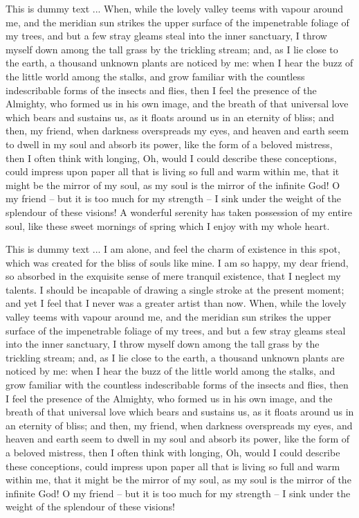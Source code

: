 \documentclass[letterpaper,oneside,11pt]{book}
\begin{document}
This is dummy text ... When, while the lovely valley teems with vapour around me, and the meridian sun strikes the upper surface of the impenetrable foliage of my trees, and but a few stray gleams steal into the inner sanctuary, I throw myself down among the tall grass by the trickling stream; and, as I lie close to the earth, a thousand unknown plants are noticed by me: when I hear the buzz of the little world among the stalks, and grow familiar with the countless indescribable forms of the insects and flies, then I feel the presence of the Almighty, who formed us in his own image, and the breath of that universal love which bears and sustains us, as it floats around us in an eternity of bliss; and then, my friend, when darkness overspreads my eyes, and heaven and earth seem to dwell in my soul and absorb its power, like the form of a beloved mistress, then I often think with longing, Oh, would I could describe these conceptions, could impress upon paper all that is living so full and warm within me, that it might be the mirror of my soul, as my soul is the mirror of the infinite God! O my friend -- but it is too much for my strength -- I sink under the weight of the splendour of these visions! A wonderful serenity has taken possession of my entire soul, like these sweet mornings of spring which I enjoy with my whole heart.



This is dummy text ... I am alone, and feel the charm of existence in this spot, which was created for the bliss of souls like mine. I am so happy, my dear friend, so absorbed in the exquisite sense of mere tranquil existence, that I neglect my talents. I should be incapable of drawing a single stroke at the present moment; and yet I feel that I never was a greater artist than now. When, while the lovely valley teems with vapour around me, and the meridian sun strikes the upper surface of the impenetrable foliage of my trees, and but a few stray gleams steal into the inner sanctuary, I throw myself down among the tall grass by the trickling stream; and, as I lie close to the earth, a thousand unknown plants are noticed by me: when I hear the buzz of the little world among the stalks, and grow familiar with the countless indescribable forms of the insects and flies, then I feel the presence of the Almighty, who formed us in his own image, and the breath of that universal love which bears and sustains us, as it floats around us in an eternity of bliss; and then, my friend, when darkness overspreads my eyes, and heaven and earth seem to dwell in my soul and absorb its power, like the form of a beloved mistress, then I often think with longing, Oh, would I could describe these conceptions, could impress upon paper all that is living so full and warm within me, that it might be the mirror of my soul, as my soul is the mirror of the infinite God! O my friend -- but it is too much for my strength -- I sink under the weight of the splendour of these visions!
\end{document}
